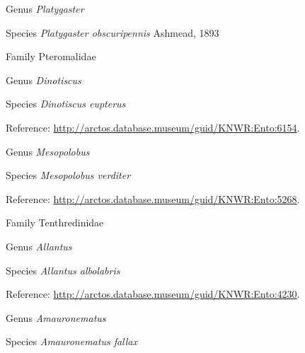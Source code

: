 \documentclass[9pt, article]{memoir}
\begin{document}
\begin{multicols}{2}
\vspace{6pt}\noindent\hspace{30pt}Genus \textit{Platygaster}


\vspace{6pt}\noindent\hspace{36pt}Species \textit{Platygaster obscuripennis} Ashmead, 1893


\vspace{6pt}\noindent\hspace{24pt}Family Pteromalidae


\vspace{6pt}\noindent\hspace{30pt}Genus \textit{Dinotiscus}


\vspace{6pt}\noindent\hspace{36pt}Species \textit{Dinotiscus eupterus}


\vspace{6pt}Reference: 
\url{http://arctos.database.museum/guid/KNWR:Ento:6154}.

\vspace{6pt}\noindent\hspace{30pt}Genus \textit{Mesopolobus}


\vspace{6pt}\noindent\hspace{36pt}Species \textit{Mesopolobus verditer}


\vspace{6pt}Reference: 
\url{http://arctos.database.museum/guid/KNWR:Ento:5268}.

\vspace{6pt}\noindent\hspace{24pt}Family Tenthredinidae


\vspace{6pt}\noindent\hspace{30pt}Genus \textit{Allantus}


\vspace{6pt}\noindent\hspace{36pt}Species \textit{Allantus albolabris}


\vspace{6pt}Reference: 
\url{http://arctos.database.museum/guid/KNWR:Ento:4230}.

\vspace{6pt}\noindent\hspace{30pt}Genus \textit{Amauronematus}


\vspace{6pt}\noindent\hspace{36pt}Species \textit{Amauronematus fallax}



\end{multicols}
\end{document}
